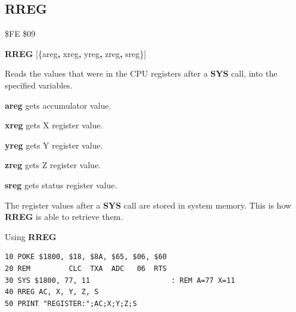\subsection{RREG}
\begin{description}[leftmargin=2cm,style=nextline]
\item [Token:]    \$FE \$09

\item [Format:]   {\bf RREG} [\{areg{\bf,} xreg{\bf,} yreg{\bf,} zreg{\bf,} sreg\}]

\item [Usage:]    Reads the values that were in the CPU registers after a {\bf SYS} call, into the specified variables.

                  {\bf areg} gets accumulator value.

                  {\bf xreg} gets X register value.

                  {\bf yreg} gets Y register value.

                  {\bf zreg} gets Z register value.

                  {\bf sreg} gets status register value.

\item [Remarks:]  The register values after a {\bf SYS} call are stored in system memory. This is how {\bf RREG} is able to retrieve them.

\item [Example:]  Using {\bf RREG}
\begin{tcolorbox}[colback=black,coltext=white]
\verbatimfont{\codefont}
\begin{verbatim}
10 POKE $1800, $18, $8A, $65, $06, $60
20 REM         CLC  TXA  ADC   06  RTS
30 SYS $1800, 77, 11                   : REM A=77 X=11
40 RREG AC, X, Y, Z, S
50 PRINT "REGISTER:";AC;X;Y;Z;S
\end{verbatim}
\end{tcolorbox}
\end{description}


\newpage
